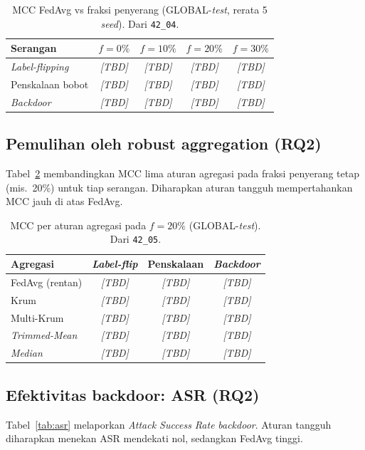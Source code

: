 \documentclass[11pt,a4paper]{article}
\newcommand{\TBD}{\textit{[TBD]}}
\begin{document}
\begin{table}[t]
\centering
\caption{MCC FedAvg vs fraksi penyerang (GLOBAL-\emph{test}, rerata 5 \emph{seed}).
Dari \texttt{42\_04}.}
\label{tab:vuln}
\begin{tabular}{lcccc}
\toprule
Serangan & $f{=}0\%$ & $f{=}10\%$ & $f{=}20\%$ & $f{=}30\%$ \\
\midrule
\emph{Label-flipping} & \TBD & \TBD & \TBD & \TBD \\
Penskalaan bobot      & \TBD & \TBD & \TBD & \TBD \\
\emph{Backdoor}       & \TBD & \TBD & \TBD & \TBD \\
\bottomrule
\end{tabular}
\end{table}

\subsection{Pemulihan oleh robust aggregation (RQ2)}
Tabel~\ref{tab:defense} membandingkan MCC lima aturan agregasi pada fraksi penyerang
tetap (mis.\ 20\%) untuk tiap serangan. Diharapkan aturan tangguh mempertahankan MCC
jauh di atas FedAvg.

\begin{table}[t]
\centering
\caption{MCC per aturan agregasi pada $f{=}20\%$ (GLOBAL-\emph{test}). Dari \texttt{42\_05}.}
\label{tab:defense}
\begin{tabular}{lccc}
\toprule
Agregasi & \emph{Label-flip} & Penskalaan & \emph{Backdoor} \\
\midrule
FedAvg (rentan) & \TBD & \TBD & \TBD \\
Krum            & \TBD & \TBD & \TBD \\
Multi-Krum      & \TBD & \TBD & \TBD \\
\emph{Trimmed-Mean} & \TBD & \TBD & \TBD \\
\emph{Median}   & \TBD & \TBD & \TBD \\
\bottomrule
\end{tabular}
\end{table}

\subsection{Efektivitas backdoor: ASR (RQ2)}
Tabel~\ref{tab:asr} melaporkan \emph{Attack Success Rate} \emph{backdoor}. Aturan
tangguh diharapkan menekan ASR mendekati nol, sedangkan FedAvg tinggi.
\end{document}
